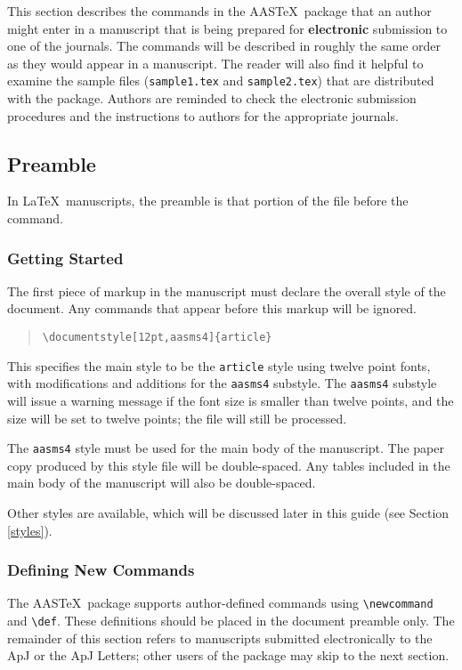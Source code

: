 This section describes the commands in the AAS\TeX\
package that an author might enter in a manuscript that is being prepared for 
{\bf electronic} submission to one of the journals.
The commands will be described in roughly the same order as they
would appear in a manuscript.
The reader will also find it helpful to examine the
sample files (\verb"sample1.tex" and \verb"sample2.tex") that are distributed
with the package.
Authors are reminded to check the electronic submission procedures and the 
instructions to authors for the appropriate journals.

\subsection{Preamble}

In \LaTeX\ manuscripts, the preamble is that portion of the file before the
\verb"" command. 

\subsubsection{Getting Started}

The first piece of markup in the manuscript must declare the
overall style of the document.  Any commands that appear before this markup
will be ignored.
\begin{quote}
\verb"\documentstyle[12pt,aasms4]{article}"
\end{quote}
This specifies the main style to be
the {\tt article} style using twelve point fonts,
with modifications and additions for the {\tt aasms4} substyle.
The {\tt aasms4} substyle will issue a warning message
if the font size is smaller than twelve points, and the
size will be set to twelve points; the file will still be processed.

The {\tt aasms4} style must be used for the main body of the manuscript. 
The paper copy produced by this style file will be double-spaced.
Any tables included in the main body of the manuscript will also be 
double-spaced. 

Other styles are available, which will be discussed 
later in this guide (see Section \ref{styles}).

\subsubsection{Defining New Commands}

The AAS\TeX\ package supports author-defined commands using \verb"\newcommand" 
and \verb"\def". These definitions should be
placed in the document preamble only.  The remainder of this section refers
to manuscripts submitted electronically to the ApJ or the ApJ Letters; other
users of the package may skip to the next section.
 
